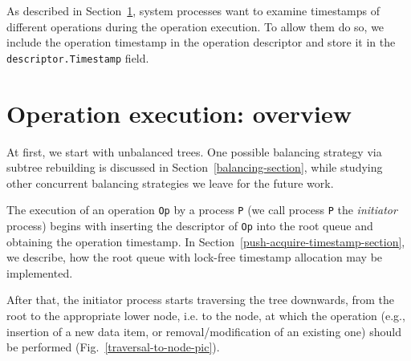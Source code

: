 \documentclass[times, dvipsnames,%
               languages={russian,english} %
              ]{itmo-student-thesis}
\begin{document}
\bigbreak

As described in Section~\ref{operation-execution-chapter}, system processes want to examine timestamps of different operations during the operation execution. To allow them do so, we include the operation timestamp in the operation descriptor and store it in the \texttt{descriptor.Timestamp} field.

\section{Operation execution: overview}
\label{operation-execution-chapter}

At first, we start with unbalanced trees. One possible balancing strategy via subtree rebuilding is discussed in Section~\ref{balancing-section}, while studying other concurrent balancing strategies we leave for the future work.

The execution of an operation \texttt{Op} by a process \texttt{P} (we call process \texttt{P} the \emph{initiator} process) begins with inserting the descriptor of \texttt{Op} into the root queue and obtaining the operation timestamp. In Section~\ref{push-acquire-timestamp-section}, we describe, how the root queue with lock-free timestamp allocation may be implemented.

After that, the initiator process starts traversing the tree downwards, from the root to the appropriate lower node, i.e. to the node, at which the operation (e.g., insertion of a new data item, or removal/modification of an existing one) should be performed (Fig.~\ref{traversal-to-node-pic}).
\end{document}
